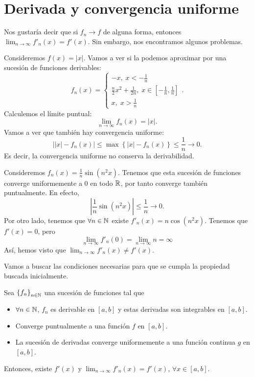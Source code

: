 \section{Derivada y convergencia uniforme}
Nos gustaría decir que si $\displaystyle f_{n} \to f $ de alguna forma, entonces $\displaystyle \lim_{n \to \infty}f'_{n}\left(x\right) = f'\left(x\right) $. Sin embargo, nos encontramos algunos problemas.
\begin{eg}
\normalfont Consideremos $\displaystyle f\left(x\right) = \left|x\right| $. Vamos a ver si la podemos aproximar por una sucesión de funciones derivables:
\[f_{n}\left(x\right) =
\begin{cases}
-x, \; x < -\frac{1}{n} \\
\frac{n}{2}x^{2}+\frac{1}{2n}, \; x \in \left[-\frac{1}{n}, \frac{1}{n}\right] \\
x, \; x > \frac{1}{n}
\end{cases}
.\]
Calculemos el límite puntual:
\[\lim_{n \to \infty}f_{n}\left(x\right) = \left|x\right| .\]
Vamos a ver que también hay convergencia uniforme:
\[ \left| \left|x\right|-f_{n}\left(x\right)\right| \leq \max \left\{ \left|x\right|-f_{n}\left(x\right)\right\} \leq \frac{1}{n} \to 0 .\]
Es decir, la convergencia uniforme no conserva la derivabilidad. 
\end{eg}
\begin{eg}
\normalfont Consideremos $\displaystyle f_{n}\left(x\right) = \frac{1}{n}\sin\left(n^{2}x\right) $. Tenemos que esta sucesión de funciones converge uniformemente a $\displaystyle 0 $ en todo $\displaystyle \mathbb{R} $, por tanto converge también puntualmente. En efecto, 
\[ \left|\frac{1}{n}\sin\left(n^{2}x\right)\right| \leq \frac{1}{n} \to 0 .\]
Por otro lado, tenemos que $\displaystyle \forall n \in \mathbb{N} $ existe $\displaystyle f'_{n}\left(x\right) = n \cos \left(n^{2}x\right) $. Tenemos que $\displaystyle f'\left(x\right) = 0 $, pero
\[\lim_{n \to \infty}f'_{n}\left(0\right) = \lim_{n \to \infty}n=\infty\]
Así, hemos visto que $\displaystyle \lim_{n \to \infty}f'_{n}\left(x\right) \neq f'\left(x\right) $.
\end{eg}
Vamos a buscar las condiciones necesarias para que se cumpla la propiedad buscada inicialmente.
\begin{ftheorem}[]
	\normalfont Sea $\displaystyle \left\{ f_{n}\right\} _{n\in\mathbb{N}} $ una sucesión de funciones tal que 
	\begin{itemize}
		\item $\displaystyle \forall n \in \mathbb{N} $, $\displaystyle f_{n} $ es derivable en $\displaystyle \left[a,b\right]  $ y estas derivadas son integrables en $\displaystyle \left[a,b\right]  $.
		\item Converge puntualmente a una función $\displaystyle f $ en $\displaystyle \left[a,b\right]  $.
		\item La sucesión de derivadas converge uniformemente a una función continua $\displaystyle g $ en $\displaystyle \left[a,b\right]  $.
	\end{itemize} 
	Entonces, existe $\displaystyle f'\left(x\right) $ y $\displaystyle \lim_{n \to \infty}f'_{n}\left(x\right) = f'\left(x\right) $, $\displaystyle \forall x \in \left[a,b\right]  $.
\end{ftheorem}
